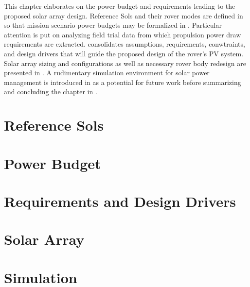 This chapter elaborates on the power budget and requirements leading to the proposed solar array design. Reference Sols and their rover modes are defined in  so that mission scenario power budgets may be formalized in . Particular attention is put on analyzing field trial data from which propulsion power draw requirements are extracted.  consolidates assumptions, requirements, conwtraints, and design drivers that will guide the proposed design of the rover's \ac{PV} system. Solar array sizing and configurations as well as necessary rover body redesign are presented in . A rudimentary simulation environment for solar power management is introduced in  as a potential for future work before summarizing and concluding the chapter in .

\section{Reference Sols}
\label{sec:Design:ReferenceSols}


\clearpage
\section{Power Budget}
\label{sec:Design:PowerBudget}


\clearpage
\section{Requirements and Design Drivers}
\label{sec:Design:RequirementsAndDesignDrivers}


\clearpage
\section{Solar Array}
\label{sec:Design:SolarArray}


\section{Simulation}
\label{sec:Design:Simulation}


